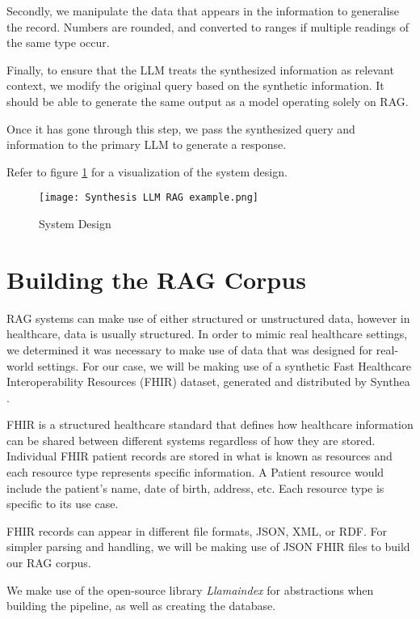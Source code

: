 Secondly, we manipulate the data that appears in the information to generalise the record. Numbers are rounded, and converted to ranges if multiple readings of the same type occur.

Finally, to ensure that the LLM treats the synthesized information as relevant context, we modify the original query based on the synthetic information. It should be able to generate the same output as a model operating solely on RAG.

Once it has gone through this step, we pass the synthesized query and information to the primary LLM to generate a response.

Refer to figure \ref{fig:SynthLLMRAG} for a visualization of the system design.

\begin{figure}
	\texttt{[image: Synthesis LLM RAG example.png]}
	\caption{System Design}
	\centering
	\label{fig:SynthLLMRAG}
\end{figure}

\section{Building the RAG Corpus}
RAG systems can make use of either structured or unstructured data, however in healthcare, data is usually structured.
In order to mimic real healthcare settings, we determined it was necessary to make use of data that was designed for real-world settings.
For our case, we will be making use of a synthetic Fast Healthcare Interoperability Resources (FHIR) dataset, generated and distributed by Synthea \autocite{Synthea2024}.

FHIR is a structured healthcare standard that defines how healthcare information can be shared between different systems regardless of how they are stored.
Individual FHIR patient records are stored in what is known as resources and each resource type represents specific information. A Patient resource would include the patient's name, date of birth, address, etc. Each resource type is specific to its use case.

FHIR records can appear in different file formats, JSON, XML, or RDF. For simpler parsing and handling, we will be making use of JSON FHIR files to build our RAG corpus.

We make use of the open-source library \textit{Llamaindex}\autocite{Liu_LlamaIndex_2022} for abstractions when building the pipeline, as well as creating the database.

